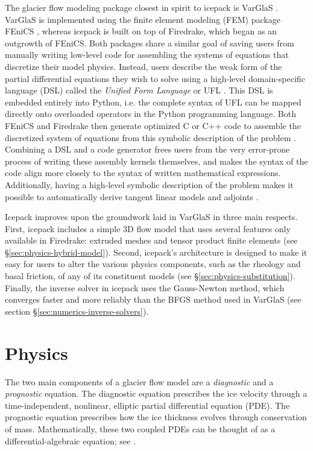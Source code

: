 \documentclass[journal abbreviation, manuscript]{copernicus}
\begin{document}
The glacier flow modeling package closest in spirit to icepack is VarGlaS \citep{brinkerhoff2013data}.
VarGlaS is implemented using the finite element modeling (FEM) package FEniCS \citep{logg2012automated}, whereas icepack is built on top of Firedrake, which began as an outgrowth of FEniCS.
Both packages share a similar goal of saving users from manually writing low-level code for assembling the systems of equations that discretize their model physics.
Instead, users describe the weak form of the partial differential equations they wish to solve using a high-level domain-specific language (DSL) called the \emph{Unified Form Language} or UFL \citep{alnaes2014unified}.
This DSL is embedded entirely into Python, i.e. the complete syntax of UFL can be mapped directly onto overloaded operators in the Python programming language.
Both FEniCS and Firedrake then generate optimized C or C++ code to assemble the discretized system of equations from this symbolic description of the problem \citep{kirby2006compiler, rathgeber2016firedrake}.
Combining a DSL and a code generator frees users from the very error-prone process of writing these assembly kernels themselves, and makes the syntax of the code align more closely to the syntax of written mathematical expressions.
Additionally, having a high-level symbolic description of the problem makes it possible to automatically derive tangent linear models and adjoints \citep{mitusch2019dolfin}.

Icepack improves upon the groundwork laid in VarGlaS in three main respects.
First, icepack includes a simple 3D flow model that uses several features only available in Firedrake: extruded meshes and tensor product finite elements \citep{bercea2016structure, mcrae2016automated} (see \S\ref{sec:physics-hybrid-model}).
Second, icepack's architecture is designed to make it easy for users to alter the various physics components, such as the rheology and basal friction, of any of its constituent models (see \S\ref{sec:physics-substitution}).
Finally, the inverse solver in icepack uses the Gauss-Newton method, which converges faster and more reliably than the BFGS method used in VarGlaS (see section \S\ref{sec:numerics-inverse-solvers}).


\section{Physics}

The two main components of a glacier flow model are a \emph{diagnostic} and a \emph{prognostic} equation.
The diagnostic equation prescribes the ice velocity through a time-independent, nonlinear, elliptic partial differential equation (PDE).
The prognostic equation prescribes how the ice thickness evolves through conservation of mass.
Mathematically, these two coupled PDEs can be thought of as a differential-algebraic equation; see \citet{ascher1998computer}.
\end{document}

